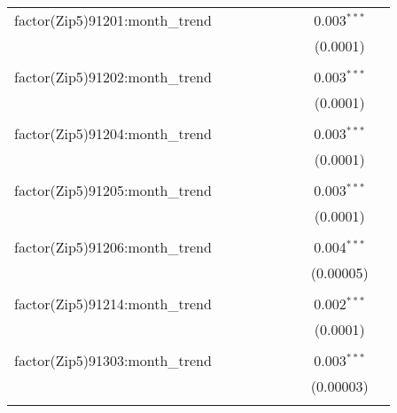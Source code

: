 \begin{table}[H]
{\begin{tabular}{@{\extracolsep{5pt}}lcccccccc}
  factor(Zip5)91201:month\_trend &  &  &  &  &  &  & 0.003$^{***}$ &  \\  

   &  &  &  &  &  &  & (0.0001) &  \\  

   & & & & & & & & \\  

  factor(Zip5)91202:month\_trend &  &  &  &  &  &  & 0.003$^{***}$ &  \\  

   &  &  &  &  &  &  & (0.0001) &  \\  

   & & & & & & & & \\  

  factor(Zip5)91204:month\_trend &  &  &  &  &  &  & 0.003$^{***}$ &  \\  

   &  &  &  &  &  &  & (0.0001) &  \\  

   & & & & & & & & \\  

  factor(Zip5)91205:month\_trend &  &  &  &  &  &  & 0.003$^{***}$ &  \\  

   &  &  &  &  &  &  & (0.0001) &  \\  

   & & & & & & & & \\  

  factor(Zip5)91206:month\_trend &  &  &  &  &  &  & 0.004$^{***}$ &  \\  

   &  &  &  &  &  &  & (0.00005) &  \\  

   & & & & & & & & \\  

  factor(Zip5)91214:month\_trend &  &  &  &  &  &  & 0.002$^{***}$ &  \\  

   &  &  &  &  &  &  & (0.0001) &  \\  

   & & & & & & & & \\  

  factor(Zip5)91303:month\_trend &  &  &  &  &  &  & 0.003$^{***}$ &  \\  

   &  &  &  &  &  &  & (0.00003) &  \\  

   & & & & & & & & \\  


\end{tabular}}
\end{table}
